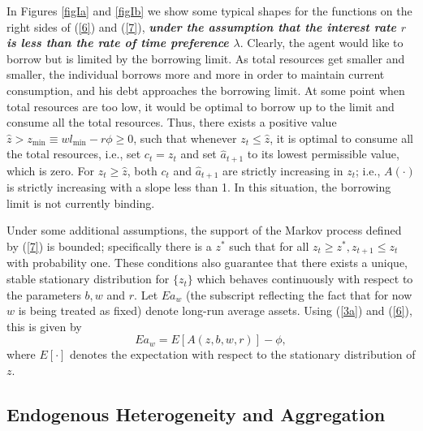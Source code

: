 \documentclass[12pt]{article}
\theoremstyle{definition}
\begin{document}
In Figures \ref{figIa} and \ref{figIb} we show some typical shapes for the functions on the right sides of (\ref{6}) and (\ref{7}), \emph{\bf under the assumption that the interest rate $r$ is less than the rate of time preference $\lambda$}. Clearly, the agent would like to borrow but is limited by the borrowing limit. As total resources get smaller and smaller, the individual borrows more and more in order to maintain current consumption, and his debt approaches the borrowing limit. At some point when total resources are too low, it would be optimal to borrow up to the limit and consume all the total resources. Thus, there exists a positive value $\hat{z} > z_{\min} \equiv wl_{\min} - r\phi \geq 0$, such that whenever $z_t \leq \hat{z}$, it is optimal to consume all the total resources, i.e., set $c_t = z_t$ and set $\hat{a}_{t+1}$ to its lowest permissible value, which is zero. For $z_t \geq \hat{z}$, both $c_t$ and $\hat{a}_{t+1}$ are strictly increasing in $z_t$; i.e., $A(\cdot)$ is strictly increasing with a slope less than 1. In this situation, the borrowing limit is not currently binding.

Under some additional assumptions, the support of the Markov process defined by (\ref{7}) is bounded; specifically there is a $z^*$ such that for all $z_t \geq z^*, z_{t+1} \leq z_t$ with probability one. These conditions also guarantee that there exists a unique, stable stationary distribution for $\{z_t\}$ which behaves continuously with respect to the parameters $b, w$ and $r$. Let $Ea_w$ (the subscript reflecting the fact that for now $w$ is being treated as fixed) denote long-run average assets. Using (\ref{3a}) and (\ref{6}), this is given by 
\begin{equation}
	\label{8} \tag{8}
	Ea_w = E \left[A(z, b, w, r)\right] - \phi,
\end{equation}
where $E[\cdot]$ denotes the expectation with respect to the stationary distribution of $z$.

\subsection{Endogenous Heterogeneity and Aggregation}
\end{document}
